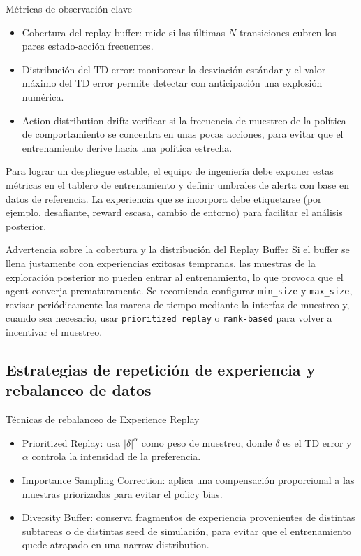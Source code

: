 \documentclass[a4paper]{article}
\begin{document}
\begin{knowledgebox}{Métricas de observación clave}
\begin{itemize}
    \item Cobertura del replay buffer: mide si las últimas $N$ transiciones cubren los pares estado-acción frecuentes.
    \item Distribución del TD error: monitorear la desviación estándar y el valor máximo del TD error permite detectar con anticipación una explosión numérica.
    \item Action distribution drift: verificar si la frecuencia de muestreo de la política de comportamiento se concentra en unas pocas acciones, para evitar que el entrenamiento derive hacia una política estrecha.
\end{itemize}
\end{knowledgebox}

Para lograr un despliegue estable, el equipo de ingeniería debe exponer estas métricas en el tablero de entrenamiento y definir umbrales de alerta con base en datos de referencia. La experiencia que se incorpora debe etiquetarse (por ejemplo, desafiante, reward escasa, cambio de entorno) para facilitar el análisis posterior.

\begin{importantbox}{Advertencia sobre la cobertura y la distribución del Replay Buffer}
Si el buffer se llena justamente con experiencias exitosas tempranas, las muestras de la exploración posterior no pueden entrar al entrenamiento, lo que provoca que el agent converja prematuramente. Se recomienda configurar \texttt{min\_size} y \texttt{max\_size}, revisar periódicamente las marcas de tiempo mediante la interfaz de muestreo y, cuando sea necesario, usar \texttt{prioritized replay} o \texttt{rank-based} para volver a incentivar el muestreo.
\end{importantbox}

\subsection{Estrategias de repetición de experiencia y rebalanceo de datos}

\begin{knowledgebox}{Técnicas de rebalanceo de Experience Replay}
\begin{itemize}
    \item Prioritized Replay: usa $|\delta|^\alpha$ como peso de muestreo, donde $\delta$ es el TD error y $\alpha$ controla la intensidad de la preferencia.
    \item Importance Sampling Correction: aplica una compensación proporcional a las muestras priorizadas para evitar el policy bias.
    \item Diversity Buffer: conserva fragmentos de experiencia provenientes de distintas subtareas o de distintas seed de simulación, para evitar que el entrenamiento quede atrapado en una narrow distribution.
\end{itemize}
\end{knowledgebox}
\end{document}
